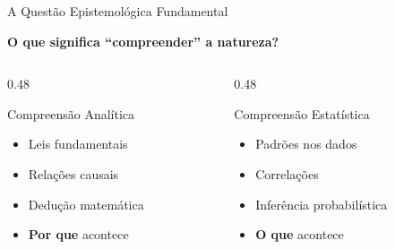 \documentclass[aspectratio=169,12pt]{beamer}
\begin{document}
\begin{frame}{A Questão Epistemológica Fundamental}
    \begin{center}
        \Large\textbf{O que significa ``compreender'' a natureza?}
    \end{center}
    \vspace{1cm}
    \begin{columns}[T]
        \begin{column}{0.48\textwidth}
            \begin{block}{Compreensão Analítica}
                \begin{itemize}
                    \item Leis fundamentais
                    \item Relações causais
                    \item Dedução matemática
                    \item \textbf{Por que} acontece
                \end{itemize}
            \end{block}
        \end{column}
        \begin{column}{0.48\textwidth}
            \begin{block}{Compreensão Estatística}
                \begin{itemize}
                    \item Padrões nos dados
                    \item Correlações
                    \item Inferência probabilística
                    \item \textbf{O que} acontece
                \end{itemize}
            \end{block}
        \end{column}
    \end{columns}
\end{frame}
\end{document}
